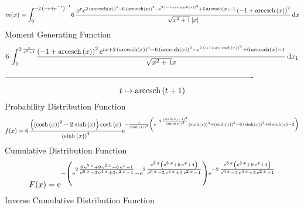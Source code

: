 \documentclass[12pt]{article}
\begin{document}
 $$ m(x) = \int_{0}^{-2\, \left( -{\rm e}+{{\rm e}^{-1}} \right) ^{-1}}\!6\,{
\frac {{x}^{r}{{\rm e}^{2\, \left( {\rm arccsch} \left(x\right)
 \right) ^{3}-6\, \left( {\rm arccsch} \left(x\right) \right) ^{2}-{
{\rm e}^{2\, \left( -1+{\rm arccsch} \left(x\right) \right) ^{3}}}+6\,
{\rm arccsch} \left(x\right)-1}} \left( -1+{\rm arccsch} \left(x
\right) \right) ^{2}}{\sqrt {{x}^{2}+1} \left| x \right| }}\,{\rm d}x
$$ Moment Generating Function 
 $$6\,\int_{0}^{2\,{\frac {{\rm e}}{{{\rm e}^{2}}-1}}}\!{\frac { \left( -
1+{\rm arccsch} \left(x\right) \right) ^{2}{{\rm e}^{tx+2\, \left( 
{\rm arccsch} \left(x\right) \right) ^{3}-6\, \left( {\rm arccsch} 
\left(x\right) \right) ^{2}-{{\rm e}^{2\, \left( -1+{\rm arccsch} 
\left(x\right) \right) ^{3}}}+6\,{\rm arccsch} \left(x\right)-1}}}{
\sqrt {{x}^{2}+1}x}}\,{\rm d}x_{{1}}
$$-------------------------------------------------------------------------------------------  \\$$t\mapsto {\rm arccsch} \left(t+1\right)
$$Probability Distribution Function 
$$  f(x)=6\,{\frac { \left(  \left( \cosh \left( x \right)  \right) ^{2}-2\,
\sinh \left( x \right)  \right) \cosh \left( x \right) }{ \left( \sinh
 \left( x \right)  \right) ^{4}}{{\rm e}^{-{\frac {1}{ \left( \sinh
 \left( x \right)  \right) ^{3}} \left( {{\rm e}^{-2\,{\frac { \left( 
\sinh \left( x \right) -1 \right) ^{3}}{ \left( \sinh \left( x
 \right)  \right) ^{3}}}}} \left( \sinh \left( x \right)  \right) ^{3}
+ \left( \sinh \left( x \right)  \right) ^{3}-6\, \left( \sinh \left( 
x \right)  \right) ^{2}+6\,\sinh \left( x \right) -2 \right) }}}}
$$Cumulative Distribution Function  
 $$F(x)={{\rm e}^{- \left( {{\rm e}^{2\,{\frac {6\,{{\rm e}^{5\,x}}+9\,{
{\rm e}^{2\,x}}+6\,{{\rm e}^{x}}+1}{{{\rm e}^{6\,x}}-3\,{{\rm e}^{4\,x
}}+3\,{{\rm e}^{2\,x}}-1}}}}-{{\rm e}^{2\,{\frac {{{\rm e}^{3\,x}}
 \left( {{\rm e}^{3\,x}}+9\,{{\rm e}^{x}}+4 \right) }{{{\rm e}^{6\,x}}
-3\,{{\rm e}^{4\,x}}+3\,{{\rm e}^{2\,x}}-1}}}} \right) {{\rm e}^{-2\,{
\frac {{{\rm e}^{3\,x}} \left( {{\rm e}^{3\,x}}+9\,{{\rm e}^{x}}+4
 \right) }{{{\rm e}^{6\,x}}-3\,{{\rm e}^{4\,x}}+3\,{{\rm e}^{2\,x}}-1}
}}}}}
$$ Inverse Cumulative Distribution Function 
\end{document}
